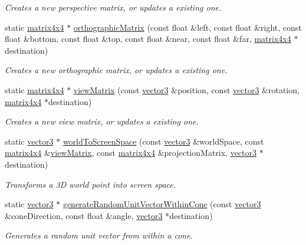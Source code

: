 \begin{DoxyCompactItemize}
\begin{DoxyCompactList}\small\item\em Creates a new perspective matrix, or updates a existing one. \end{DoxyCompactList}\item 
static \hyperlink{classflounder_1_1matrix4x4}{matrix4x4} $\ast$ \hyperlink{classflounder_1_1matrix4x4_ae44bdcd9e5a3ad141801a9da313e3fba}{orthographic\+Matrix} (const float \&left, const float \&right, const float \&bottom, const float \&top, const float \&near, const float \&far, \hyperlink{classflounder_1_1matrix4x4}{matrix4x4} $\ast$destination)
\begin{DoxyCompactList}\small\item\em Creates a new orthographic matrix, or updates a existing one. \end{DoxyCompactList}\item 
static \hyperlink{classflounder_1_1matrix4x4}{matrix4x4} $\ast$ \hyperlink{classflounder_1_1matrix4x4_aee10976c10baabe8c69374ab64431cd4}{view\+Matrix} (const \hyperlink{classflounder_1_1vector3}{vector3} \&position, const \hyperlink{classflounder_1_1vector3}{vector3} \&rotation, \hyperlink{classflounder_1_1matrix4x4}{matrix4x4} $\ast$destination)
\begin{DoxyCompactList}\small\item\em Creates a new view matrix, or updates a existing one. \end{DoxyCompactList}\item 
static \hyperlink{classflounder_1_1vector3}{vector3} $\ast$ \hyperlink{classflounder_1_1matrix4x4_a38e620a079b7ce6d5faa4ded52dbd636}{world\+To\+Screen\+Space} (const \hyperlink{classflounder_1_1vector3}{vector3} \&world\+Space, const \hyperlink{classflounder_1_1matrix4x4}{matrix4x4} \&\hyperlink{classflounder_1_1matrix4x4_aee10976c10baabe8c69374ab64431cd4}{view\+Matrix}, const \hyperlink{classflounder_1_1matrix4x4}{matrix4x4} \&projection\+Matrix, \hyperlink{classflounder_1_1vector3}{vector3} $\ast$destination)
\begin{DoxyCompactList}\small\item\em Transforms a 3D world point into screen space. \end{DoxyCompactList}\item 
static \hyperlink{classflounder_1_1vector3}{vector3} $\ast$ \hyperlink{classflounder_1_1matrix4x4_a8edd59480633091d5fa6458bbb853cc9}{generate\+Random\+Unit\+Vector\+Within\+Cone} (const \hyperlink{classflounder_1_1vector3}{vector3} \&cone\+Direction, const float \&angle, \hyperlink{classflounder_1_1vector3}{vector3} $\ast$destination)
\begin{DoxyCompactList}\small\item\em Generates a random unit vector from within a cone. \end{DoxyCompactList}\end{DoxyCompactItemize}
